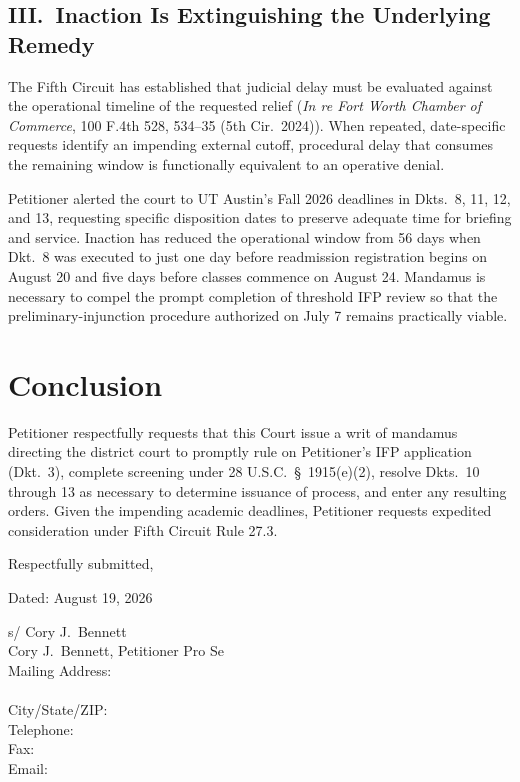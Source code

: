 \documentclass[14pt]{extarticle}
\renewcommand{\FilingDate}{August 19, 2026}
\begin{document}
\subsection*{III.\ Inaction Is Extinguishing the Underlying Remedy}

The Fifth Circuit has established that judicial delay must be evaluated against the operational timeline of the requested relief (\textit{In re Fort Worth Chamber of Commerce}, 100 F.4th 528, 534--35 (5th Cir.\ 2024)). When repeated, date-specific requests identify an impending external cutoff, procedural delay that consumes the remaining window is functionally equivalent to an operative denial.

Petitioner alerted the court to UT Austin's Fall 2026 deadlines in Dkts.\ 8, 11, 12, and 13, requesting specific disposition dates to preserve adequate time for briefing and service. Inaction has reduced the operational window from 56 days when Dkt.\ 8 was executed to just one day before readmission registration begins on August 20 and five days before classes commence on August 24. Mandamus is necessary to compel the prompt completion of threshold IFP review so that the preliminary-injunction procedure authorized on July 7 remains practically viable.

\section*{Conclusion}

\enlargethispage{\baselineskip}
Petitioner respectfully requests that this Court issue a writ of mandamus directing the district court to promptly rule on Petitioner's IFP application (Dkt.\ 3), complete screening under 28 U.S.C.\ \S\ 1915(e)(2), resolve Dkts.\ 10 through 13 as necessary to determine issuance of process, and enter any resulting orders. Given the impending academic deadlines, Petitioner requests expedited consideration under Fifth Circuit Rule 27.3.

\singlespacing
\vspace{0.6em}
\noindent Respectfully submitted,

\vspace{0.15em}
\noindent Dated: \FilingDate

\vspace{0.15em}
\noindent s/ Cory J.\ Bennett\\
Cory J.\ Bennett, Petitioner Pro Se\\
Mailing Address: \FilingPlaintiffMailingLineOne\\
\phantom{Mailing Address: }\FilingPlaintiffMailingLineTwo\\
City/State/ZIP: \FilingPlaintiffMailingCityStateZip\\
Telephone: \FilingPlaintiffTelephone\\
Fax: \FilingPlaintiffFax\\
Email: \FilingPlaintiffEmail
\end{document}
